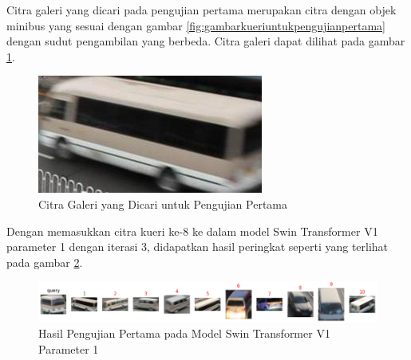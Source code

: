 Citra galeri yang dicari pada pengujian pertama merupakan citra dengan objek \linebreak minibus yang sesuai dengan gambar 
\ref{fig:gambarkueriuntukpengujianpertama} dengan sudut pengambilan yang berbeda. Citra galeri dapat 
dilihat pada gambar \ref{fig:gambargaleriuntukpengujianpertama}.


\begin{figure}[h!]
  \centering
  \includegraphics[scale=0.6]{gambar/Gal8_1018.jpg}
  \caption{Citra Galeri yang Dicari untuk Pengujian Pertama}
  \label{fig:gambargaleriuntukpengujianpertama}
\end{figure}

Dengan memasukkan citra kueri ke-8 ke dalam model Swin Transformer V1 parameter 1 dengan iterasi 3, didapatkan hasil 
peringkat seperti yang terlihat pada gambar \ref{fig:hasilpengujianpertamapadamodelswintransformerv1param1}.

\begin{figure}[h!]
  \centering
  \includegraphics[scale=0.6]{gambar/Que8V1P1IT3.png}
  \caption{Hasil Pengujian Pertama pada Model Swin Transformer V1 Parameter 1}
  \label{fig:hasilpengujianpertamapadamodelswintransformerv1param1}
\end{figure}

